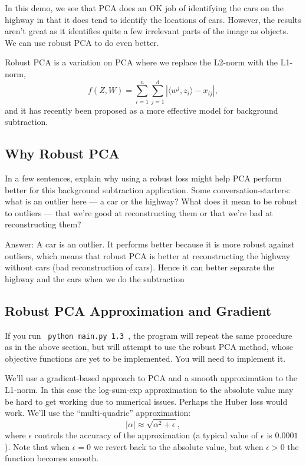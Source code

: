 \documentclass{article}
\newcommand{\blu}[1]{{\textcolor{blu}{#1}}}
\newcommand{\gre}[1]{\textcolor{gre}{#1}}
\newcommand\ans[1]{\par\gre{Answer: #1}}
\let\ask\blu
\begin{document}
In this demo, we see that PCA does an OK job of identifying the cars on the highway in that it does tend to identify the locations of cars. However, the results aren't great as it identifies quite a few irrelevant parts of the image as objects. We can use robust PCA to do even better.

Robust PCA is a variation on PCA where we replace the L2-norm with the L1-norm,
\[
f(Z,W) = \sum_{i=1}^n\sum_{j=1}^d |\langle w^j, z_i\rangle - x_{ij}|,
\]
and it has recently been proposed as a more effective model for background subtraction.

\subsection{Why Robust PCA}

\ask{In a few sentences, explain why using a robust loss might help PCA perform better for this background subtraction application.} Some conversation-starters: what is an outlier here --- a car or the highway? What does it mean to be robust to outliers --- that we're good at reconstructing them or that we're bad at reconstructing them?
\ans{A car is an outlier. It performs better because it is more robust against outliers, which means that robust PCA is better at reconstructing the highway without cars (bad reconstruction of cars). Hence it can better separate the highway and the cars when we do the subtraction}

\subsection{Robust PCA Approximation and Gradient}

If you run \verb| python main.py 1.3 |, the program will repeat the same procedure as in the above section, but will attempt to use the robust PCA method, whose objective functions are yet to be implemented. You will need to implement it.

We'll use a gradient-based approach to PCA and a smooth approximation to the L1-norm. In this case the log-sum-exp approximation to the absolute value may be hard to get working due to numerical issues. Perhaps the Huber loss would work. We'll use the ``multi-quadric'' approximation:
\[
|\alpha| \approx \sqrt{\alpha^2 + \epsilon},
\]
where $\epsilon$ controls the accuracy of the approximation (a typical value of $\epsilon$ is $0.0001$). Note that when $\epsilon=0$ we revert back to the absolute value, but when $\epsilon>0$ the function becomes smooth.
\end{document}
